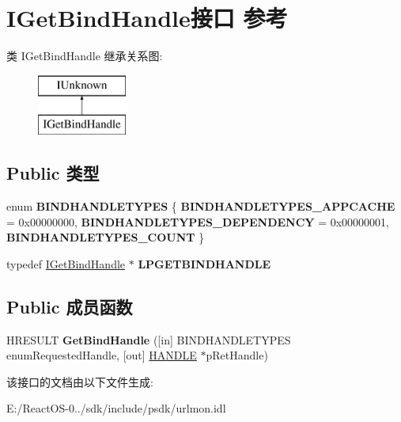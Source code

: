 \hypertarget{interface_i_get_bind_handle}{}\section{I\+Get\+Bind\+Handle接口 参考}
\label{interface_i_get_bind_handle}
类 I\+Get\+Bind\+Handle 继承关系图\+:\begin{figure}[H]
\begin{center}
\leavevmode
\includegraphics[height=2.000000cm]{interface_i_get_bind_handle}
\end{center}
\end{figure}
\subsection*{Public 类型}
\begin{DoxyCompactItemize}
\item 
\mbox{\label{interface_i_get_bind_handle_a62cbd0a96eda4f8932cbe8561c6c2bf3}} 
enum {\bfseries B\+I\+N\+D\+H\+A\+N\+D\+L\+E\+T\+Y\+P\+ES} \{ {\bfseries B\+I\+N\+D\+H\+A\+N\+D\+L\+E\+T\+Y\+P\+E\+S\+\_\+\+A\+P\+P\+C\+A\+C\+HE} = 0x00000000, 
{\bfseries B\+I\+N\+D\+H\+A\+N\+D\+L\+E\+T\+Y\+P\+E\+S\+\_\+\+D\+E\+P\+E\+N\+D\+E\+N\+CY} = 0x00000001, 
{\bfseries B\+I\+N\+D\+H\+A\+N\+D\+L\+E\+T\+Y\+P\+E\+S\+\_\+\+C\+O\+U\+NT}
 \}
\item 
\mbox{\label{interface_i_get_bind_handle_ab33a9d5452f5941a3cc0c08b885bcb38}} 
typedef \hyperlink{interface_i_get_bind_handle}{I\+Get\+Bind\+Handle} $\ast$ {\bfseries L\+P\+G\+E\+T\+B\+I\+N\+D\+H\+A\+N\+D\+LE}
\end{DoxyCompactItemize}
\subsection*{Public 成员函数}
\begin{DoxyCompactItemize}
\item 
\mbox{\label{interface_i_get_bind_handle_abe0d8a7957621a0c64223f1eb626e4db}} 
H\+R\+E\+S\+U\+LT {\bfseries Get\+Bind\+Handle} (\mbox{[}in\mbox{]} B\+I\+N\+D\+H\+A\+N\+D\+L\+E\+T\+Y\+P\+ES enum\+Requested\+Handle, \mbox{[}out\mbox{]} \hyperlink{interfacevoid}{H\+A\+N\+D\+LE} $\ast$p\+Ret\+Handle)
\end{DoxyCompactItemize}


该接口的文档由以下文件生成\+:\begin{DoxyCompactItemize}
\item 
E\+:/\+React\+O\+S-\/0../sdk/include/psdk/urlmon.\+idl\end{DoxyCompactItemize}
